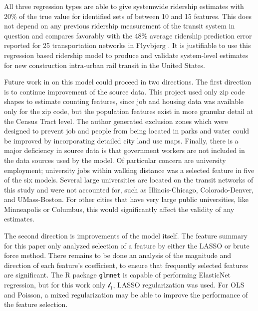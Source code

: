 \documentclass[11pt]{article}
\begin{document}
All three regression types are able to give systemwide ridership estimates with 20\% of the true value for identified sets of between 10 and 15 features. This does not depend on any previous ridership measurement of the transit system in question and compares favorably with the 48\% average ridership prediction  error reported for 25 transportation networks in Flyvbjerg \cite{Flyvbjerg2006}. It is justifiable to use this regression based ridership model to produce and validate system-level estimates for new construction intra-urban rail transit in the United States. 

Future work in on this model could proceed in two directions. The first direction is to continue improvement of the source data. This project used only zip code shapes to estimate counting features, since job and housing data was available only for the zip code, but the population features exist in more granular detail at the Census Tract level. The author generated exclusion zones which were designed to prevent job and people from being located in parks and water could be improved by incorporating detailed city land use maps. Finally, there is a major deficiency in source data is that government workers are not included in the data sources used by the model. Of particular concern are university employment; university jobs within walking distance was a selected feature in five of the six models. Several large universities are located on the transit networks of this study and were not accounted for, such as Illinois-Chicago, Colorado-Denver, and UMass-Boston. For other cities that have very large public universities, like Minneapolis or Columbus, this would significantly affect the validity of any estimates.

The second direction is improvements of the model itself. The feature summary for this paper only analyzed selection of a feature by either the LASSO or brute force method. There remains to be done an analysis of the magnitude and direction of each feature's coefficient, to ensure that frequently selected features are significant. The R package \texttt{glmnet} is capable of performing ElasticNet regression, but for this work only $\mathcal{l}_1$, LASSO regularization was used. For OLS and Poisson, a mixed regularization may be able to improve the performance of the feature selection. 
\end{document}
